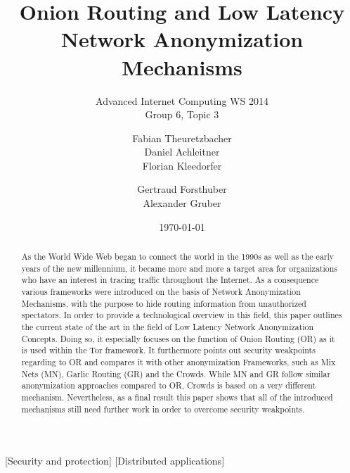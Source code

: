 \documentclass{sig-alternate}
\begin{document}
\title{Onion Routing and Low Latency Network Anonymization Mechanisms}
\subtitle{Advanced Internet Computing WS 2014 \\ Group 6, Topic 3}


\author{
\alignauthor
Fabian Theuretzbacher\\
\alignauthor
Daniel Achleitner\\
\alignauthor Florian Kleedorfer\\
\and  %
\alignauthor Gertraud Forsthuber\\
\alignauthor Alexander Gruber\\
\and
\and
{}
}

\date{\today}
\maketitle

\begin{abstract}

As the World Wide Web began to connect the world in the 1990s as well as the early years of the new millennium, it became more and more a target area for organizations who have an interest in tracing traffic throughout the Internet. As a consequence various frameworks were introduced on the basis of Network Anonymization Mechanisms, with the purpose to hide routing information from unauthorized spectators. In order to provide a technological overview in this field, this paper outlines the current state of the art in the field of Low Latency Network Anonymization Concepts. Doing so, it especially focuses on the function of Onion Routing (OR) as it is used within the Tor framework. It furthermore points out security weakpoints regarding to OR and compares it with other anonymization Frameworks, such as Mix Nets (MN), Garlic Routing (GR) and the Crowds. While MN and GR follow similar anonymization approaches compared to OR, Crowds is based on a very different mechanism. Nevertheless, as a final result this paper shows that all of the introduced mechanisms still need further work in order to overcome security weakpoints.

\end{abstract}

[Security and protection]
[Distributed applications]
\end{document}
